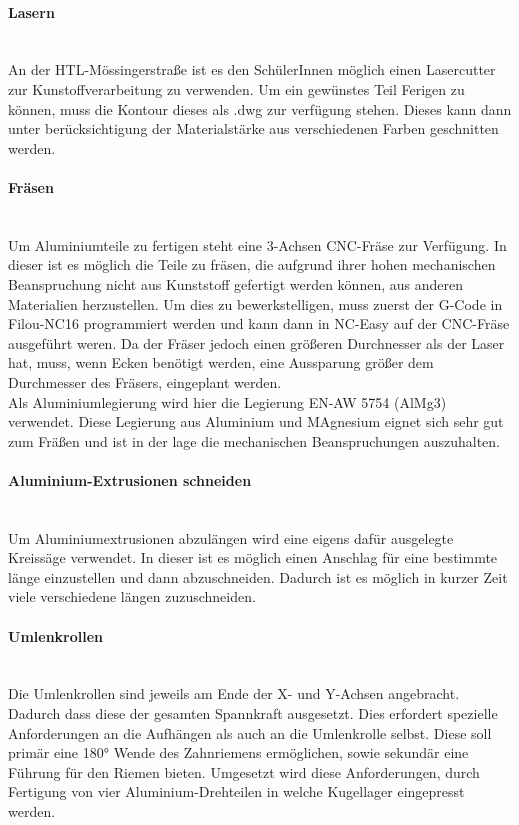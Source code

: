 \paragraph{Lasern}\mbox{}\\
An der HTL-Mössingerstraße ist es den SchülerInnen möglich einen Lasercutter zur Kunstoffverarbeitung zu verwenden. Um ein gewünstes Teil Ferigen zu können, muss die Kontour dieses als .dwg zur verfügung stehen. Dieses kann dann unter berücksichtigung der Materialstärke aus verschiedenen Farben geschnitten werden.


\paragraph{Fräsen}\mbox{}\\
Um Aluminiumteile zu fertigen steht eine 3-Achsen CNC-Fräse zur Verfügung. In dieser ist es möglich die Teile zu fräsen, die aufgrund ihrer hohen mechanischen Beanspruchung nicht aus Kunststoff gefertigt werden können, aus anderen Materialien herzustellen. Um dies zu bewerkstelligen, muss zuerst der G-Code in Filou-NC16 programmiert werden und kann dann in NC-Easy auf der CNC-Fräse ausgeführt weren. Da der Fräser jedoch einen größeren Durchnesser als der Laser hat, muss, wenn Ecken benötigt werden, eine Aussparung größer dem Durchmesser des Fräsers, eingeplant werden.\\
Als Aluminiumlegierung wird hier die Legierung EN-AW 5754 (AlMg3) verwendet. Diese Legierung aus Aluminium und MAgnesium eignet sich sehr gut zum Fräßen und ist in der lage die mechanischen Beanspruchungen auszuhalten.

\paragraph{Aluminium-Extrusionen schneiden}\mbox{}\\
Um Aluminiumextrusionen abzulängen wird eine eigens dafür ausgelegte Kreissäge verwendet. In dieser ist es möglich einen Anschlag für eine bestimmte länge einzustellen und dann abzuschneiden. Dadurch ist es möglich in kurzer Zeit viele verschiedene längen zuzuschneiden. 

\paragraph{Umlenkrollen}\mbox{}\\
Die Umlenkrollen sind jeweils am Ende der X- und Y-Achsen angebracht. Dadurch dass diese der gesamten Spannkraft ausgesetzt. Dies erfordert spezielle Anforderungen an die Aufhängen als auch an die Umlenkrolle selbst. Diese soll primär eine 180° Wende des Zahnriemens ermöglichen, sowie sekundär eine Führung für den Riemen bieten. 
Umgesetzt wird diese Anforderungen, durch Fertigung von vier Aluminium-Drehteilen in welche Kugellager eingepresst werden.

